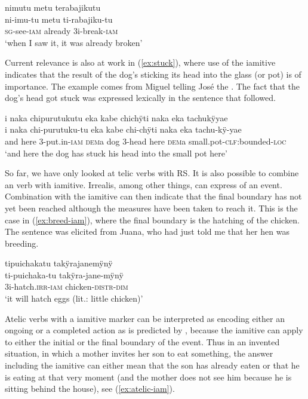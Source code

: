 \ea\label{ex:broken-iam}
\begingl
\glpreamble nimutu metu terabajikutu\\
\gla ni-imu-tu metu ti-rabajiku-tu\\
\textsc{sg}-see-\textsc{iam} already 3i-break-\textsc{iam}\\
\glft ‘when I saw it, it was already broken’
\endgl
{}
\xe

Current relevance is also at work in (\ref{ex:stuck}), where use of the iamitive indicates that the result of the dog’s sticking its head into the glass (or pot) is of importance. The example comes from Miguel telling José the . The fact that the dog’s head got stuck was expressed lexically in the sentence that followed. 

\ea\label{ex:stuck}
\begingl
\glpreamble i naka chipurutukutu eka kabe chichÿti naka eka tachukÿyae\\
\gla i naka chi-purutuku-tu eka kabe chi-chÿti naka eka tachu-kÿ-yae\\
\glb and here 3-put.in-\textsc{iam} \textsc{dem}a dog 3-head here \textsc{dem}a small.pot-\textsc{clf}:bounded-\textsc{loc}\\
\glft ‘and here the dog has stuck his head into the small pot here’
\endgl
\trailingcitation{[mox-a110920l-2.052]}
\xe

So far, we have only looked at telic verbs with  RS. It is also possible to combine an  verb with iamitive. Irrealis, among other things, can express  of an event. Combination with the iamitive can then indicate that the final boundary has not yet been reached although the measures have been taken to reach it. This is the case in (\ref{ex:breed-iam}), where the final boundary is the hatching of the chicken. The sentence was elicited from Juana, who had just told me that her hen was breeding.

\ea\label{ex:breed-iam}
\begingl
\glpreamble tipuichakatu takÿrajanemÿnÿ\\
\gla ti-puichaka-tu takÿra-jane-mÿnÿ\\
\glb 3i-hatch.\textsc{irr}-\textsc{iam} chicken-\textsc{distr}-\textsc{dim}\\
\glft ‘it will hatch eggs (lit.: little chicken)’
\endgl
\trailingcitation{[jxx-e110923l-2.086]}
\xe

Atelic verbs with a iamitive marker can be interpreted as encoding either an ongoing or a completed action as is predicted by \citet[19]{Olsson2013}, because the iamitive can apply to either the initial or the final boundary of the event. Thus in an invented situation, in which a mother invites her son to eat something, the answer including the iamitive can either mean that the son has already eaten or that he is eating at that very moment (and the mother does not see him because he is sitting behind the house), see (\ref{ex:atelic-iam}). 

